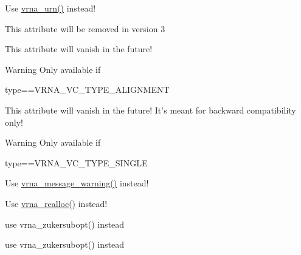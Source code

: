 \begin{DoxyRefList}
\item[\label{deprecated__deprecated000153}%
\hypertarget{deprecated__deprecated000153}{}%
Global \hyperlink{utils_8h_aaa328491c84996e445d027fde9800f2e}{urn} (void)]Use \hyperlink{group__utils_ga384e256ebb295d04a14426179db0dd6e}{vrna\+\_\+urn()} instead!  
\item[\label{deprecated__deprecated000092}%
\hypertarget{deprecated__deprecated000092}{}%
Global \hyperlink{group__energy__parameters_a378d5bcf2bae1f3ec84c912c7d3908d2}{vrna\+\_\+exp\+\_\+param\+\_\+s\+:\+:id} ]This attribute will be removed in version 3  
\item[\label{deprecated__deprecated000048}%
\hypertarget{deprecated__deprecated000048}{}%
Global \hyperlink{group__fold__compound_abf5e82d14649b6179ae60ed7da6e4fc0}{vrna\+\_\+fc\+\_\+s\+:\+:pscore\+\_\+pf\+\_\+compat} ]This attribute will vanish in the future! \begin{DoxyWarning}{Warning}
Only available if\begin{DoxyVerb}type==VRNA_VC_TYPE_ALIGNMENT \end{DoxyVerb}
  
\end{DoxyWarning}

\item[\label{deprecated__deprecated000047}%
\hypertarget{deprecated__deprecated000047}{}%
Global \hyperlink{group__fold__compound_a7fe1235ce3d41287695f1ae1e283e8fc}{vrna\+\_\+fc\+\_\+s\+:\+:ptype\+\_\+pf\+\_\+compat} ]This attribute will vanish in the future! It's meant for backward compatibility only! \begin{DoxyWarning}{Warning}
Only available if\begin{DoxyVerb}type==VRNA_VC_TYPE_SINGLE \end{DoxyVerb}
  
\end{DoxyWarning}

\item[\label{deprecated__deprecated000148}%
\hypertarget{deprecated__deprecated000148}{}%
Global \hyperlink{utils_8h_af2355fa8746f2f30fbe71db65dea3d51}{warn\+\_\+user} (const char message\mbox{[}\mbox{]})]Use \hyperlink{group__utils_gafe4072406bd287c6857763dd7d2fe1f1}{vrna\+\_\+message\+\_\+warning()} instead!  
\item[\label{deprecated__deprecated000151}%
\hypertarget{deprecated__deprecated000151}{}%
Global \hyperlink{utils_8h_a9037ada838835b1b9db41581a021b0c8}{xrealloc} (void $\ast$p, unsigned size)]Use \hyperlink{group__utils_ga27f4719a66c6f90d1cca3d1e6e696c6a}{vrna\+\_\+realloc()} instead!  
\item[\label{deprecated__deprecated000144}%
\hypertarget{deprecated__deprecated000144}{}%
Global \hyperlink{group__subopt__zuker_ga0d5104e3ecf119d8eabd40aa5fe47f90}{zukersubopt} (const char $\ast$string)]use vrna\+\_\+zukersubopt() instead 
\item[\label{deprecated__deprecated000145}%
\hypertarget{deprecated__deprecated000145}{}%
Global \hyperlink{group__subopt__zuker_gab6d0ea8cc1d02f6dd831ca81043c9eb8}{zukersubopt\+\_\+par} (const char $\ast$string, vrna\+\_\+param\+\_\+t $\ast$parameters)]use vrna\+\_\+zukersubopt() instead
\end{DoxyRefList}